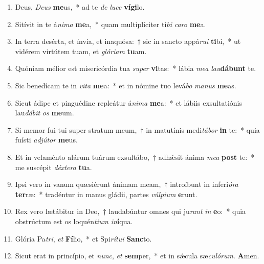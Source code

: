 \documentclass[twoside]{article}
\begin{document}
\begin{paracol}[1]{2}
\begin{enumerate}[wide, itemsep=0mm, labelwidth=!, labelindent=0pt, label=\color{gregoriocolor}\theenumi]
\item Deus, \textit{De}\textit{us} \textbf{me}us,~* ad te \textit{de} \textit{lu}\textit{ce} \textbf{ví}\textbf{gi}lo.
\item Sitívit in te á\textit{ni}\textit{ma} \textbf{me}a,~* quam multiplíciter ti\textit{bi} \textit{ca}\textit{ro} \textbf{me}a.
\item In terra desérta, et ínvia, et inaquósa:~† sic in sancto appá\textit{ru}\textit{i} \textbf{ti}bi,~* ut vidérem virtútem tuam, et \textit{gló}\textit{ri}\textit{am} \textbf{tu}am.
\item Quóniam mélior est misericórdia tua \textit{su}\textit{per} \textbf{vi}tas:~* lábia \textit{me}\textit{a} \textit{lau}\textbf{dá}\textbf{bunt} te.
\item Sic benedícam te in \textit{vi}\textit{ta} \textbf{me}a:~* et in nómine tuo levá\textit{bo} \textit{ma}\textit{nus} \textbf{me}as.
\item Sicut ádipe et pinguédine repleátur á\textit{ni}\textit{ma} \textbf{me}a:~* et lábiis exsultatiónis lau\textit{dá}\textit{bit} \textit{os} \textbf{me}um.
\item Si memor fui tui super stratum meum,~† in matutínis medi\textit{tá}\textit{bor} \textbf{in} te:~* quia fuísti \textit{ad}\textit{jú}\textit{tor} \textbf{me}us.
\item Et in velaménto alárum tuárum exsultábo,~† adhǽsit ánima \textit{me}\textit{a} \textbf{post} te:~* me suscépit \textit{déx}\textit{te}\textit{ra} \textbf{tu}a.
\item Ipsi vero in vanum quæsiérunt ánimam meam,~† introíbunt in inferi\textit{ó}\textit{ra} \textbf{ter}ræ:~* tradéntur in manus gládii, partes \textit{vúl}\textit{pi}\textit{um} \textbf{e}runt.
\item Rex vero lætábitur in Deo,~† laudabúntur omnes qui ju\textit{rant} \textit{in} \textbf{e}o:~* quia obstrúctum est os loquén\textit{ti}\textit{um} \textit{in}\textbf{í}qua.
\item Glória Pa\textit{tri}, \textit{et} \textbf{Fí}lio,~* et Spi\textit{rí}\textit{tu}\textit{i} \textbf{Sanc}to.
\item Sicut erat in princípio, et \textit{nunc}, \textit{et} \textbf{sem}per,~* et in sǽcula sæ\textit{cu}\textit{ló}\textit{rum}. \textbf{A}men.
\end{enumerate}

\switchcolumn


\end{paracol}
\end{document}
